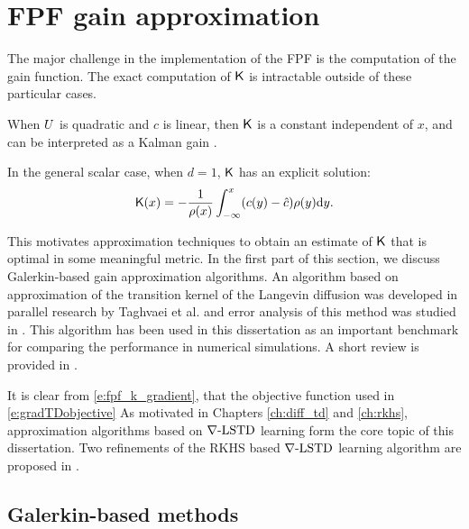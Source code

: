 \section{FPF gain approximation}
The major challenge in the implementation of the FPF is the computation of the gain function. The exact computation of $\text{\sf K}$ is intractable outside of these particular cases. 
\begin{romannum}
\item When $U$ is quadratic and $c$ is linear,  then $\text{\sf K}$ is a constant independent of $x$, and can be interpreted as a Kalman gain \cite{yanlaumehmey13}. 

\item In the general scalar case, when $d=1$, $\text{\sf K}$ has an explicit solution:
\begin{equation}
\kFPF(x) = - \frac{1}{\pr(x)} \int_{-\infty}^{x} (c(y) - \hat{c}) \pr(y) \ud y.
\label{e:kfpf1d}
\end{equation}
\end{romannum}

This motivates approximation techniques to obtain an estimate of $\text{\sf K}$ that is optimal in some meaningful metric. In the first part of this section, we discuss Galerkin-based gain approximation algorithms. An algorithm based on approximation of the transition kernel of the Langevin diffusion was developed in parallel research by Taghvaei et al. \cite{tagmeh16} and error analysis of this method was studied in \cite{tagmehmey17}. This algorithm has been used in this dissertation as an important benchmark for comparing the performance in numerical simulations. A short review is provided in . 

It is clear from \eqref{e:fpf_k_gradient}, that the objective function used in \eqref{e:gradTDobjective}  
As motivated in Chapters \ref{ch:diff_td} and \ref{ch:rkhs}, approximation algorithms based on $\nabla\text{-LSTD}$ learning form the core topic of this dissertation. Two refinements of the RKHS based $\nabla\text{-LSTD}$ learning algorithm are proposed in .

\subsection{Galerkin-based methods}
\label{s:galerkin}

